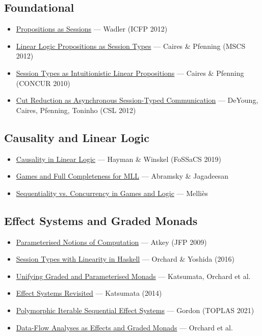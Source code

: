 \documentclass[11pt]{article}
\begin{document}
\subsection{Foundational}
\label{sec:orge693d2f}
\begin{itemize}
\item \href{https://homepages.inf.ed.ac.uk/wadler/papers/propositions-as-sessions/propositions-as-sessions.pdf}{Propositions as Sessions} — Wadler (ICFP 2012)
\item \href{https://www.cs.cmu.edu/\~fp/papers/mscs13.pdf}{Linear Logic Propositions as Session Types} — Caires \& Pfenning (MSCS 2012)
\item \href{https://link.springer.com/chapter/10.1007/978-3-642-15375-4\_16}{Session Types as Intuitionistic Linear Propositions} — Caires \& Pfenning (CONCUR 2010)
\item \href{https://drops.dagstuhl.de/entities/document/10.4230/LIPIcs.CSL.2012.228}{Cut Reduction as Asynchronous Session-Typed Communication} — DeYoung, Caires, Pfenning, Toninho (CSL 2012)
\end{itemize}
\subsection{Causality and Linear Logic}
\label{sec:org383c35c}
\begin{itemize}
\item \href{https://link.springer.com/chapter/10.1007/978-3-030-17127-8\_9}{Causality in Linear Logic} — Hayman \& Winskel (FoSSaCS 2019)
\item \href{https://arxiv.org/abs/1311.6057}{Games and Full Completeness for MLL} — Abramsky \& Jagadeesan
\item \href{https://arxiv.org/pdf/1111.7159}{Sequentiality vs. Concurrency in Games and Logic} — Melliès
\end{itemize}
\subsection{Effect Systems and Graded Monads}
\label{sec:org952a525}
\begin{itemize}
\item \href{https://www.researchgate.net/publication/220676480\_Parameterised\_notions\_of\_computation}{Parameterised Notions of Computation} — Atkey (JFP 2009)
\item \href{https://kar.kent.ac.uk/66632/1/RP\_9788793519817C10.pdf}{Session Types with Linearity in Haskell} — Orchard \& Yoshida (2016)
\item \href{https://arxiv.org/pdf/2001.10274}{Unifying Graded and Parameterised Monads} — Katsumata, Orchard et al.
\item \href{https://www.cs.kent.ac.uk/people/staff/dao7/publ/effects-revisited.pdf}{Effect Systems Revisited} — Katsumata (2014)
\item \href{https://dl.acm.org/doi/fullHtml/10.1145/3450272}{Polymorphic Iterable Sequential Effect Systems} — Gordon (TOPLAS 2021)
\item \href{https://kar.kent.ac.uk/81880/1/dataflow-effect-monads.pdf}{Data-Flow Analyses as Effects and Graded Monads} — Orchard et al.
\end{itemize}
\end{document}
